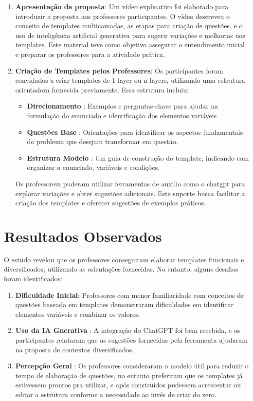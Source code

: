 \begin{enumerate}
    \item \textbf{Apresentação da proposta}: Um vídeo explicativo foi elaborado para introduzir a proposta aos professores participantes. O vídeo descreveu o conceito de templates multicamadas, as etapas para criação de questões, e o uso de inteligência artificial generativa para sugerir variações e melhorias nos templates. Este material teve como objetivo assegurar o entendimento inicial e preparar os professores para a atividade prática.
    
    \item \textbf{Criação de Templates pelos Professores}: Os participantes foram convidados a criar templates de 1-layer ou n-layers, utilizando uma estrutura orientadora fornecida previamente. Essa estrutura incluiu:
    \begin{itemize}
        \item \textbf{Direcionamento} : Exemplos e perguntas-chave para ajudar na formulação do enunciado e identificação dos elementos variáveis
        \item \textbf{Questões Base} : Orientações para identificar os aspectos fundamentais do problema que desejam transformar em questão.
        \item \textbf{Estrutura Modelo} : Um guia de construção do template, indicando com organizar o enunciado, variáveis e condições.
    \end{itemize}
    Os professorem puderam utilizar ferramentas de auxilio como o \acrshort{chatgpt} para explorar variações e obter sugestões adicionais. Este suporte busca facilitar a criação dos templates e oferecer sugestões de exemplos práticos.
\end{enumerate}

\section{Resultados Observados}

O estudo revelou que os professores conseguiram elaborar templates funcionais e diversificados, utilizando as orientações fornecidas. No entanto, alguns desafios foram identificados:

\begin{enumerate}
    \item \textbf{Dificuldade Inicial}: Professores com menor familiaridade com conceitos de questões baseada em templates demonstraram dificuldades em identificar elementos variáveis e combinar os valores.
    \item \textbf{Uso da IA Gnerativa} : A integração do ChatGPT foi bem recebida, e os participantes relataram que as sugestões fornecidas pela ferramenta ajudaram na proposta de contextos diversificados.
    \item \textbf{Percepção Geral} : Os professores consideraram o modelo útil para reduzir o tempo de elaboração de questões, no entanto preferiram que os templates já estivessem prontos pra utilizar, e após construídos pudessem acrescentar ou editar a estrutura conforme a necessidade ao invés de criar do zero.
\end{enumerate}


